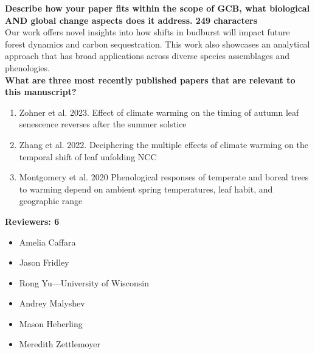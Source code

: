 \documentclass{letter}
\begin{document}
\textbf{Describe how your paper fits within the scope of GCB, what biological AND global change aspects does it address. 249 characters}\\

Our work offers novel insights into how shifts in budburst will impact future forest dynamics and carbon sequestration. This work also showcases an analytical approach that has broad applications across diverse species assemblages and phenologies.\\

\textbf{What are three most recently published papers that are relevant to this manuscript?}\\
\begin{enumerate}
\item Zohner et al. 2023. Effect of climate warming on the timing of autumn leaf senescence reverses after the summer solstice\\
\item Zhang et al. 2022. Deciphering the multiple effects of climate warming on the temporal shift of leaf unfolding NCC\\
\item Montgomery et al. 2020 Phenological responses of temperate and boreal trees to warming depend on ambient spring temperatures, leaf habit, and geographic range
\end{enumerate}

\textbf{Reviewers: 6}
\begin{itemize}
\item Amelia Caffara
\item Jason Fridley 
\item Rong Yu---University of Wisconsin 
\item Andrey Malyshev
\item Mason Heberling
\item Meredith Zettlemoyer
\end{itemize}




\end{document}
